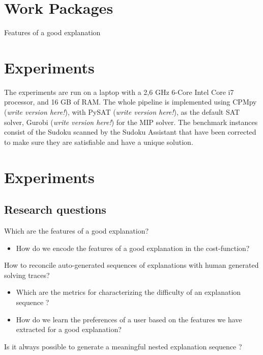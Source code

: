 \documentclass[a4paper,UKenglish,cleveref, autoref, cleveref, thm-restate,pdfa]{lipics-v2021}
\begin{document}
	\section{Work Packages}
	
	\begin{WP}
		\item Features of a good explanation
		\item 		
	\end{WP}
	
	\section{Experiments}
	
	The experiments are run on a laptop with a  2,6 GHz 6-Core Intel Core i7 processor, and 16 GB of RAM.
	The whole pipeline is implemented using CPMpy (\textit{write version here!}), with PySAT (\textit{write version here!}), as the default SAT solver, Gurobi (\textit{write version here!}) for the MIP solver. The benchmark instances consist of the Sudoku scanned by the Sudoku Assistant that have been corrected to make sure they are satisfiable and have a unique solution.
	
	
	\section{Experiments}
	
	\subsection{Research questions}
\begin{RQ}
	\item\label{Features-good-explanation} Which are the features of a good explanation?
	\begin{itemize}
		\item How do we encode the features of a good explanation in the cost-function?
	\end{itemize}
	\item \label{reconcicle-explanation-sequences} How to reconcile auto-generated sequences of explanations with human generated solving traces? 
	\begin{itemize}
		\item Which are the metrics  for characterizing the difficulty of an explanation sequence ?
		\item How do we learn the preferences of a user based on the features we have extracted for a good explanation?
	\end{itemize}
	\item\label{meaningful-nested-sequence} Is it always possible to generate a meaningful nested explanation sequence ?
\end{RQ}
\end{document}
